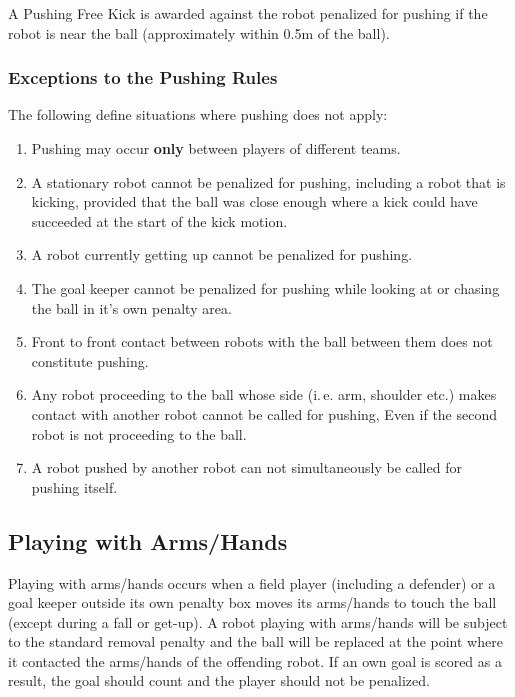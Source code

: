 \documentclass[12pt]{article}
\newcommand{\ie}{\mbox{i.\,e.}\xspace}
\begin{document}
A Pushing Free Kick is awarded against the robot penalized for pushing if the robot is near the ball (approximately within 0.5m of the ball).

\subsubsection{Exceptions to the Pushing Rules}
\label{sec:situations_no_pushing}

The following define situations where pushing does not apply:

\begin{enumerate}
  \item Pushing may occur \textbf{only} between players of different teams.
  \item A stationary robot cannot be penalized for pushing, including a robot that is kicking, provided that the ball was close enough where a kick could have succeeded at the start of the kick motion. 
  \item A robot currently getting up cannot be penalized for pushing.
  \item The goal keeper cannot be penalized for pushing while looking at or chasing the ball in it's own penalty area.
  \item Front to front contact between robots with the ball between them does not constitute pushing.
  \item Any robot proceeding to the ball whose side (\ie arm, shoulder etc.) makes contact with another robot cannot be called for pushing, Even if the second robot is not proceeding to the ball.
  \item A robot pushed by another robot can not simultaneously be called for pushing itself.
\end{enumerate}

\subsection{Playing with Arms/Hands}
\label{sec:hand_ball}

Playing with arms/hands occurs when a field player (including a defender) or a goal keeper outside its own penalty box moves its arms/hands to touch the ball (except during a fall or get-up). A robot playing with arms/hands will be subject to the standard removal penalty and the ball will be replaced at the point where it contacted the arms/hands of the offending robot.  If an own goal is scored as a result, the goal should count and the player should not be penalized.
\end{document}
